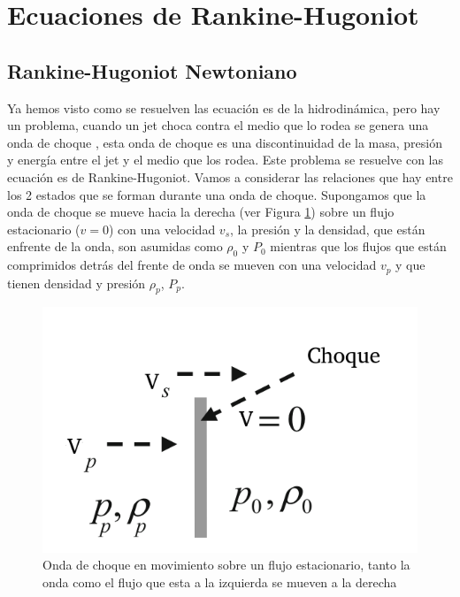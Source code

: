 \documentclass[12pt,a4paper]{book}
\begin{document}
\section{Ecuaciones de Rankine-Hugoniot}\label{sec:Ecuacion_Rankine_Hugoniot}

\subsection{Rankine-Hugoniot Newtoniano}

Ya hemos visto como se resuelven las ecuación  es de la hidrodinámica, pero hay un problema, cuando un jet  choca contra el medio que lo rodea se genera una onda de choque
, esta onda de choque es una discontinuidad de la masa, presión y energía entre el jet y el medio que los rodea. Este problema se resuelve con las ecuación  es de 
Rankine-Hugoniot.
Vamos a considerar las relaciones que hay entre los 2 estados que se forman durante una onda de choque. Supongamos que la onda de choque se mueve 
hacia la derecha (ver Figura \ref{fig_move_shock}) sobre un flujo estacionario ($v = 0$) con una velocidad $v_s$, la presión y la densidad, que están enfrente de la onda, son asumidas como
$\rho_0$ y $P_0$ mientras que los flujos que están comprimidos detrás del frente de onda se mueven con una velocidad $v_p$ y que tienen densidad y presión $\rho_p$, $P_p$.

\begin{figure}
  \centering
  \includegraphics[scale=0.7]{./Figuras/Teoria/move_shock.png}
  \caption{Onda de choque en movimiento sobre un flujo estacionario, tanto la onda como el flujo que esta a la izquierda se mueven a la derecha}\label{fig_move_shock}
\end{figure}
  
\end{document}
